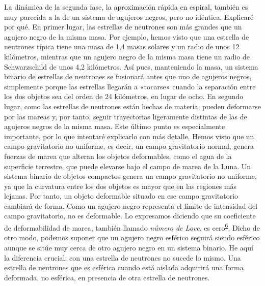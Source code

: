 La dinámica de la segunda fase, la aproximación rápida en espiral, también es muy parecida a la de un sistema de agujeros negros, pero no idéntica. Explicaré por qué. En primer lugar, las estrellas de neutrones son más grandes que un agujero negro de la misma masa. Por ejemplo, hemos visto que una estrella de neutrones típica tiene una masa de 1,4 masas solares y un radio de unos 12 kilómetros, mientras que un agujero negro de la misma masa tiene un radio de Schwarzschild de unos 4,2 kilómetros. Así pues, manteniendo la masa, un sistema binario de estrellas de neutrones se fusionará antes que uno de agujeros negros, simplemente porque las estrellas llegarán a «tocarse» cuando la separación entre los dos objetos sea del orden de 24 kilómetros, en lugar de ocho. En segundo lugar, como las estrellas de neutrones están hechas de materia, pueden deformarse por las mareas y, por tanto, seguir trayectorias ligeramente distintas de las de agujeros negros de la misma masa. Este último punto es especialmente importante, por lo que intentaré explicarlo con más detalle. Hemos visto que un campo gravitatorio no uniforme, es decir, un campo gravitatorio normal, genera fuerzas de marea que alteran los objetos deformables, como el agua de la superficie terrestre, que puede elevarse bajo el campo de marea de la Luna. Un sistema binario de objetos compactos genera un campo gravitatorio no uniforme, ya que la curvatura entre los dos objetos es mayor que en las regiones más lejanas. Por tanto, un objeto deformable situado en ese campo gravitatorio cambiará de forma. Como un agujero negro representa el límite de intensidad del campo gravitatorio, no es deformable. Lo expresamos diciendo que su coeficiente de deformabilidad de marea, también llamado \emph{número de Love}, es cero\textsuperscript{\hyperlink{note:08-06}{6}}. Dicho de otro modo, podemos suponer que un agujero negro esférico seguirá siendo esférico aunque se sitúe muy cerca de otro agujero negro en un sistema binario. He aquí la diferencia crucial: con una estrella de neutrones no sucede lo mismo. Una estrella de neutrones que es esférica cuando está aislada adquirirá una forma deformada, no esférica, en presencia de otra estrella de neutrones.

